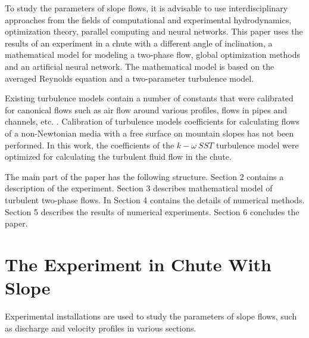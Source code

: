 \documentclass[sensors,article,submit,moreauthors,pdftex]{Definitions/mdpi}
\begin{document}
To study the parameters of slope flows, it is advisable to use interdisciplinary approaches from the fields of computational and experimental hydrodynamics, optimization theory, parallel computing and neural networks. This paper uses the results of an experiment in a chute with a different angle of inclination, a mathematical model for modeling a two-phase flow, global optimization methods and an artificial neural network. The mathematical model is based on the averaged Reynolds equation and a two-parameter turbulence model. 

Existing turbulence models contain a number of constants that were calibrated for canonical flows such as air flow around various profiles, flows in pipes and channels, etc. \cite{LaunderSpalding1974, Tahry1983, LaunderMorseRodiSpaldiug1972}. Calibration of turbulence models coefficients for calculating flows of a non-Newtonian media with a free surface on mountain slopes has not been performed. In this work, the coefficients of the $k-\omega\ SST$ turbulence model were optimized for calculating the turbulent fluid flow in the chute.

The main part of the paper has the following structure. 
Section 2 contains a description of the experiment. Section 3 describes mathematical model of turbulent two-phase flows. In Section 4 contains the details of numerical methods. 
Section 5 describes the results of numerical experiments. 
Section 6 concludes the paper.


\section{The Experiment in Chute With Slope}


Experimental installations are used to study the parameters of slope flows, such as discharge and velocity profiles in various sections.
\end{document}
